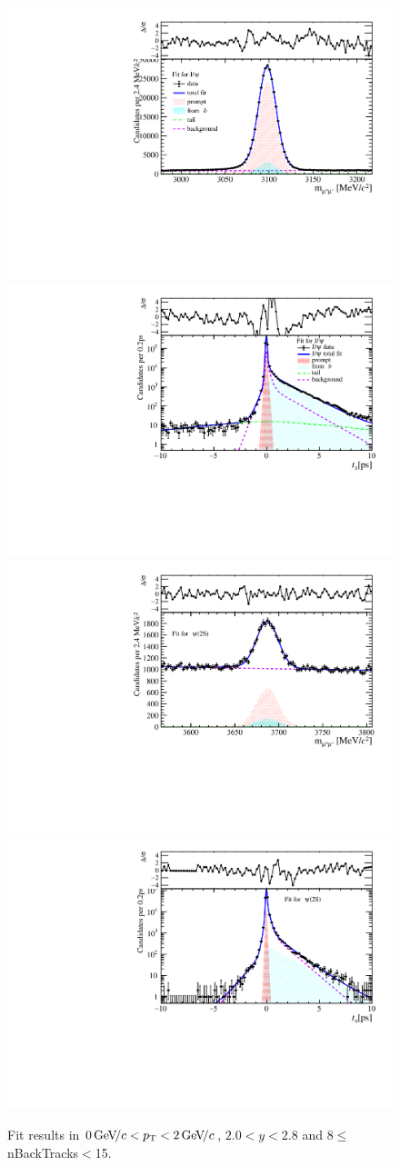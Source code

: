 \begin{figure}[H]
\begin{center}
\includegraphics[width=0.47\linewidth]{pdf/Jpsi/drawmassB/n2y1pt1.pdf}
\includegraphics[width=0.47\linewidth]{pdf/Jpsi/2DFitB/n2y1pt1.pdf}
\vspace*{-0.5cm}
\includegraphics[width=0.47\linewidth]{pdf/Psi2S/drawmassB/n2y1pt1.pdf}
\includegraphics[width=0.47\linewidth]{pdf/Psi2S/2DFitB/n2y1pt1.pdf}
\vspace*{-0.5cm}
\end{center}
\caption{Fit results in $0\text{\,Ge\kern -0.1em V\!/}c<p_{\mathrm{T}}<2\text{\,Ge\kern -0.1em V\!/}c$, $2.0<y<2.8$ and 8$\leq$nBackTracks$<$15.}
\label{Fitn2y1pt1}
\end{figure}
